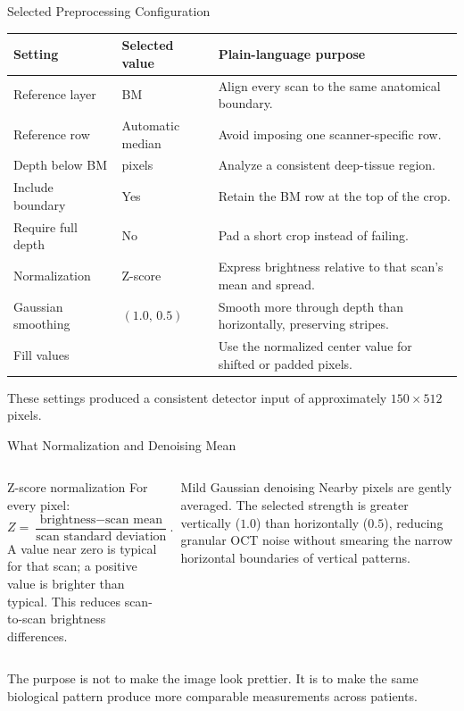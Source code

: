 \documentclass[aspectratio=169]{beamer}
\begin{document}
\begin{frame}{Selected Preprocessing Configuration}

\small
\begin{table}
\centering
\begin{tabular}{>{\raggedright\arraybackslash}p{}
                >{\raggedright\arraybackslash}p{}
                >{\raggedright\arraybackslash}p{}}
\toprule
Setting & Selected value & Plain-language purpose \\
\midrule
Reference layer & BM & Align every scan to the same anatomical boundary. \\
Reference row & Automatic median & Avoid imposing one scanner-specific row. \\
Depth below BM & 150 pixels & Analyze a consistent deep-tissue region. \\
Include boundary & Yes & Retain the BM row at the top of the crop. \\
Require full depth & No & Pad a short crop instead of failing. \\
Normalization & Z-score & Express brightness relative to that scan's mean and spread. \\
Gaussian smoothing & $(1.0,\,0.5)$ & Smooth more through depth than horizontally, preserving stripes. \\
Fill values & 0 & Use the normalized center value for shifted or padded pixels. \\
\bottomrule
\end{tabular}
\end{table}

These settings produced a consistent detector input of approximately
$150\times512$ pixels.

\end{frame}

\begin{frame}{What Normalization and Denoising Mean}

\begin{columns}[T]
\begin{block}{Z-score normalization}
For every pixel:
\[
Z=\frac{\text{brightness}-\text{scan mean}}
        {\text{scan standard deviation}}.
\]
A value near zero is typical for that scan; a positive value is brighter than
typical. This reduces scan-to-scan brightness differences.
\end{block}

\begin{block}{Mild Gaussian denoising}
Nearby pixels are gently averaged. The selected strength is greater vertically
($1.0$) than horizontally ($0.5$), reducing granular OCT noise without
smearing the narrow horizontal boundaries of vertical patterns.
\end{block}
\end{columns}

\vspace{0.35cm}

The purpose is not to make the image look prettier. It is to make the same
biological pattern produce more comparable measurements across patients.

\end{frame}
\end{document}
